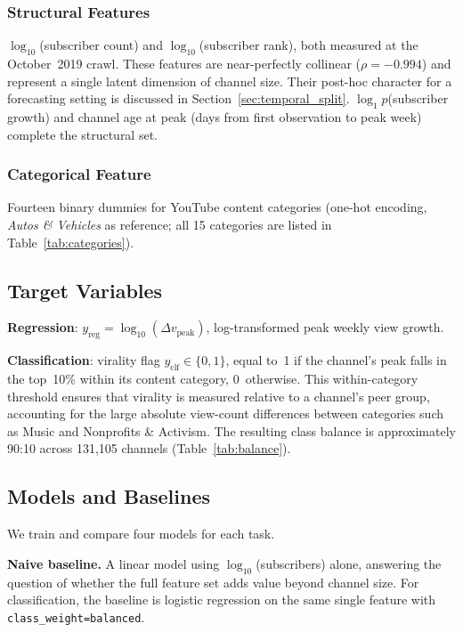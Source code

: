 \documentclass[journal,article,submit,pdftex,moreauthors]{Definitions/mdpi}
\begin{document}
\subsubsection{Structural Features}

$\log_{10}$(subscriber count) and $\log_{10}$(subscriber rank), both
measured at the October~2019 crawl.
These features are near-perfectly collinear ($\rho = -0.994$) and
represent a single latent dimension of channel size.
Their post-hoc character for a forecasting setting is discussed in
Section~\ref{sec:temporal_split}.
$\log_{1}p$(subscriber growth) and channel age at peak (days from first
observation to peak week) complete the structural set.

\subsubsection{Categorical Feature}

Fourteen binary dummies for YouTube content categories (one-hot encoding,
\emph{Autos \& Vehicles} as reference; all 15 categories are listed in
Table~\ref{tab:categories}).

\subsection{Target Variables}
\label{sec:targets}

\textbf{Regression}: $y_\text{reg} = \log_{10}(\Delta v_\text{peak})$,
log-transformed peak weekly view growth.

\textbf{Classification}: virality flag $y_\text{clf} \in \{0,1\}$, equal
to~1 if the channel's peak falls in the top~10\% within its content
category, 0~otherwise.
This within-category threshold ensures that virality is measured relative
to a channel's peer group, accounting for the large absolute view-count
differences between categories such as Music and Nonprofits \& Activism.
The resulting class balance is approximately 90:10 across 131,105 channels
(Table~\ref{tab:balance}).

\subsection{Models and Baselines}
\label{sec:models}

We train and compare four models for each task.

\textbf{Naive baseline.}
A linear model using $\log_{10}$(subscribers) alone, answering the
question of whether the full feature set adds value beyond channel size.
For classification, the baseline is logistic regression on the same
single feature with \texttt{class\_weight=balanced}.
\end{document}
